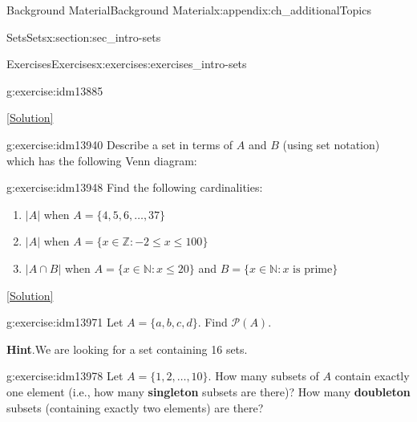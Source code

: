 \documentclass[oneside,10pt,]{book}
\newcommand{\terminology}[1]{\textbf{#1}}
\numberwithin{equation}{chapter}
\def\N{\mathbb N}
\def\Z{\mathbb Z}
\def\pow{\mathcal P}
\def\st{:}
\begin{document}
\begin{appendixptx}{Background Material}{}{Background Material}{}{}{x:appendix:ch_additionalTopics}
\begin{sectionptx}{Sets}{}{Sets}{}{}{x:section:sec_intro-sets}
\begin{exercises-subsection}{Exercises}{}{Exercises}{}{}{x:exercises:exercises_intro-sets}
\begin{divisionexercise}{7}{}{}{g:exercise:idm13885}
\begin{enumerate}[label=(\alph*)]
\end{enumerate}
%
\space\hspace*{0pt}\hfill{\tiny\hyperlink{g:solution:idm13901-main}{[Solution]}}\end{divisionexercise}%
\begin{divisionexercise}{8}{}{}{g:exercise:idm13940}%
Describe a set in terms of \(A\) and \(B\) (using set notation) which has the following Venn diagram:%
\begin{sidebyside}{1}{0.4}{0.4}{0}%
\begin{sbspanel}{0.2}%
%
\end{sbspanel}%
\end{sidebyside}%
\end{divisionexercise}%
\begin{divisionexercise}{9}{}{}{g:exercise:idm13948}%
Find the following cardinalities:%
\begin{enumerate}[label=(\alph*)]
\item{}\(|A|\) when \(A = \{4,5,6,\ldots,37\}\)%
\item{}\(|A|\) when \(A = \{x \in \Z \st -2 \le x \le 100\}\)%
\item{}\(|A \cap B|\) when \(A = \{x \in \N \st x \le 20\}\) and \(B = \{x \in \N \st x \mbox{ is prime} \}\)%
\end{enumerate}
%
\space\hspace*{0pt}\hfill{\tiny\hyperlink{g:solution:idm13962-main}{[Solution]}}\end{divisionexercise}%
\begin{divisionexercise}{10}{}{}{g:exercise:idm13971}%
Let \(A = \{a, b, c, d\}\). Find \(\pow(A)\).%
\par\smallskip%
\noindent\textbf{Hint}.\hypertarget{g:hint:idm13976}{}\quad{}We are looking for a set containing 16 sets.%
\end{divisionexercise}%
\begin{divisionexercise}{11}{}{}{g:exercise:idm13978}%
Let \(A = \{1,2,\ldots, 10\}\). How many subsets of \(A\) contain exactly one element (i.e., how many \terminology{singleton} subsets are there)? How many \terminology{doubleton} subsets (containing exactly two elements) are there?%

\end{divisionexercise}
\end{exercises-subsection}
\end{sectionptx}
\end{appendixptx}
\end{document}
